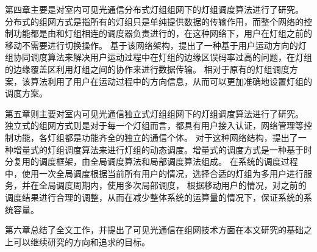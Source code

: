 第四章主要是对室内可见光通信分布式灯组组网下的灯组调度算法进行了研究。
分布式的组网方式是指所有的灯组只是单纯提供数据的传输作用，而整个网络的控制功能都是由和灯组相连的调度器负责进行的，在这种网络下，用户在灯组之前的移动不需要进行切换操作。
基于该网络架构，提出了一种基于用户运动方向的灯组协同调度算法来解决用户运动过程中在灯组的边缘区误码率过高的问题，在灯组的边缘覆盖区利用灯组之间的协作来进行数据传输。
相对于原有的灯组调度方案，该算法利用了用户在运动过程中的方向信息，从而可以更加准确地设置灯组的调度方案。

第五章则主要对室内可见光通信独立式灯组组网下的灯组调度算法进行了研究。
独立式的组网方式则是对于每一个灯组而言，都具有用户接入认证，网络管理等控制功能，各灯组都是功能齐全的独立的通信个体。
对于这种网络结构，提出了一种增量式的灯组调度算法来进行灯组的动态调度。增量式的调度方式是一种基于时分复用的调度框架，由全局调度算法和局部调度算法组成。
在系统的调度过程中，使用一次全局调度根据当前所有用户的情况，选择合适的灯组为多用户进行服务，并在全局调度周期内，使用多次局部调度，
根据移动用户的情况，对之前的调度结果进行合理的调整，从而在减少整体系统的运算量的情况下，保证系统的系统容量。

第六章总结了全文工作，并提出了可见光通信在组网技术方面在本文研究的基础之上可以继续研究的方向和追求的目标。 